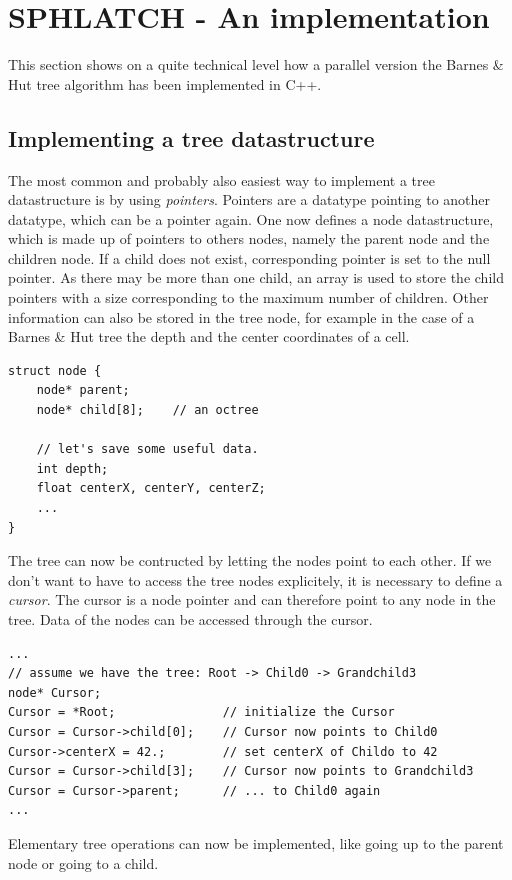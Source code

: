 
\section{SPHLATCH - An implementation}

This section shows on a quite technical level how a parallel version the Barnes \& Hut tree algorithm has been implemented in C++.

\subsection{Implementing a tree datastructure}
The most common and probably also easiest way to implement a tree datastructure is by using \emph{pointers}. Pointers are a datatype pointing to another datatype, which can be a pointer again. One now defines a node datastructure, which is made up of pointers to others nodes, namely the parent node and the children node. If a child does not exist, corresponding pointer is set to the null pointer. As there may be more than one child, an array is used to store the child pointers with a size corresponding to the maximum number of children. Other information can also be stored in the tree node, for example in the case of a Barnes \& Hut tree the depth and the center coordinates of a cell.
\begin{verbatim}
struct node {
    node* parent;
    node* child[8];    // an octree
    
    // let's save some useful data.
    int depth;
    float centerX, centerY, centerZ;
    ...
}
\end{verbatim}

The tree can now be contructed by letting the nodes point to each other. If we don't want to have to access the tree nodes explicitely, it is necessary to define a \emph{cursor}. The cursor is a node pointer and can therefore point to any node in the tree. Data of the nodes can be accessed through the cursor. 
\begin{verbatim}
...
// assume we have the tree: Root -> Child0 -> Grandchild3
node* Cursor;
Cursor = *Root;               // initialize the Cursor
Cursor = Cursor->child[0];    // Cursor now points to Child0
Cursor->centerX = 42.;        // set centerX of Childo to 42
Cursor = Cursor->child[3];    // Cursor now points to Grandchild3
Cursor = Cursor->parent;      // ... to Child0 again
...
\end{verbatim}

Elementary tree operations can now be implemented, like going up to the parent node or going to a child.\\

